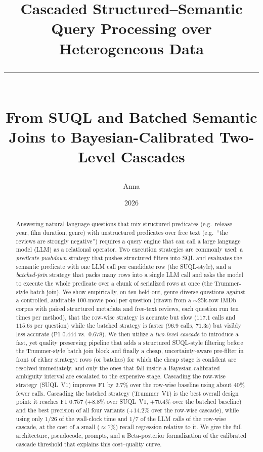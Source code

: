 \documentclass[12pt, a4paper]{memoir} %
\title{Cascaded Structured--Semantic Query Processing over Heterogeneous Data\\\vspace{-1ex}\rule{18ex}{0.5pt}\\From SUQL and Batched Semantic Joins to Bayesian-Calibrated Two-Level Cascades}
\author{Anna}
\date{2026} %
\theoremstyle{definition}
\begin{document}
\sloppy
{} %
\frontmatter
\begin{titlingpage}
\maketitle
\end{titlingpage}

\setlength{\parskip}{-1pt plus 1pt}

\renewcommand{\abstracttextfont}{\normalfont}
\abstractintoc
\begin{abstract}
Answering natural-language questions that mix structured predicates (e.g.\ release year, film duration, genre) with unstructured predicates over free text (e.g.\ ``the reviews are strongly negative'') requires a query engine that can call a large language model (LLM) as a relational operator. Two execution strategies are commonly used: a \emph{predicate-pushdown} strategy that pushes structured filters into SQL and evaluates the semantic predicate with one LLM call per candidate row (the SUQL-style), and a \emph{batched-join} strategy that packs many rows into a single LLM call and asks the model to execute the whole predicate over a chunk of serialized rows at once (the Trummer-style batch join). We show empirically, on ten held-out, genre-diverse questions against a controlled, auditable $100$-movie pool per question (drawn from a $\sim$25k-row IMDb corpus with paired structured metadata and free-text reviews, each question run ten times per method), that the row-wise strategy is accurate but slow ($117.1$ calls and $115.6$s per question) while the batched strategy is faster ($96.9$ calls, $71.3$s) but visibly less accurate (F1 $0.444$ vs.\ $0.678$). We then utilize a \emph{two-level cascade} to introduce a fast, yet quality preserving pipeline that adds a structured SUQL-style filtering before the Trummer-style batch join block and finally a cheap, uncertainty-aware pre-filter in front of either strategy: rows (or batches) for which the cheap stage is confident are resolved immediately, and only the ones that fall inside a Bayesian-calibrated ambiguity interval are escalated to the expensive stage. Cascading the row-wise strategy (SUQL~V1) improves F1 by $2.7\%$ over the row-wise baseline using about $40\%$ fewer calls. Cascading the batched strategy (Trummer~V1) is the best overall design point: it reaches F1 $0.757$ ($+8.8\%$ over SUQL~V1, $+70.4\%$ over the batched baseline) and the best precision of all four variants ($+14.2\%$ over the row-wise cascade), while using only $1/26$ of the wall-clock time and $1/7$ of the LLM calls of the row-wise cascade, at the cost of a small ($\approx 7\%$) recall regression relative to it. We give the full architecture, pseudocode, prompts, and a Beta-posterior formalization of the calibrated cascade threshold that explains this cost--quality curve.
\end{abstract}
\abstractintoc
\end{document}
